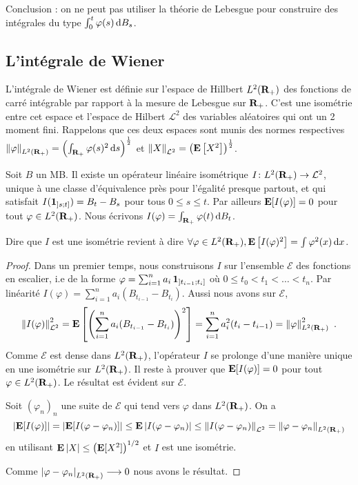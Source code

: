 	Conclusion : on ne peut pas utiliser la théorie de Lebesgue pour construire des intégrales du type $\int_0^t \varphi(s) \mathop{}\mathopen{}\mathrm{d} B_s$.


\subsection{L'intégrale de Wiener}

	L'intégrale de Wiener est définie sur l'espace de Hillbert $L^2(\mathbf{R}_+)$ des fonctions de carré intégrable par rapport à la mesure de Lebesgue sur $\mathbf{R}_+$.
	C'est une isométrie entre cet espace et l'espace de Hilbert $\mathcal{L}^2$ des variables aléatoires qui ont un 2 moment fini.
	Rappelons que ces deux espaces sont munis des normes respectives $\left\lVert\varphi\right\rVert_{L^2(\mathbf{R}_+)} = \left( \int_{\mathbf{R}_+} \varphi(s)^2 \mathop{}\mathopen{}\mathrm{d} s \right)^{\frac{1}{2}}$ et $\left\lVert X\right\rVert_{\mathcal{L}^2} = \left( \mathbf{E} \left[ X^2 \right] \right)^{\frac{1}{2}}$.
	
	\begin{thm}
		Soit $B$ un MB.
		Il existe un opérateur linéaire isométrique $I \colon L^2(\mathbf{R}_+) \to \mathcal{L}^2$, unique à une classe d'équivalence près pour l'égalité presque partout, et qui satisfait $I(\operatorname{\mathbf{1}}_{\mathopen{}\mathclose{\left]s\mathclose{}\mathpunct{};t\right]}}) = B_t - B_s$ pour tous $0 \leq s \leq t$.
		Par ailleurs $\mathbf{E}[I(\varphi)] = 0$ pour tout $\varphi \in L^2(\mathbf{R}_+)$.
		Nous écrivons $I(\varphi) = \int_{\mathbf{R}_+} \varphi(t) \mathop{}\mathopen{}\mathrm{d} B_t$.
	\end{thm}
	
	\begin{rem}
		Dire que $I$ est une isométrie revient à dire $\forall \varphi \in L^2(\mathbf{R}_+), \mathbf{E} \left[ I(\varphi)^2 \right] = \int \varphi^2(x) \mathop{}\mathopen{}\mathrm{d} x$.
	\end{rem}
	
	\begin{proof}
		Dans un premier temps, nous construisons $I$ sur l'ensemble $\mathcal{E}$ des fonctions en escalier, i.e de la forme $\varphi = \sum_{i = 1}^n a_i \operatorname{\mathbf{1}}_{\mathopen{}\mathclose{\left]t_{i-1}\mathclose{}\mathpunct{};t_i\right]}}$ où $0 \leq t_0 < t_1 < \ldots < t_n$.
		Par linéarité $I(\varphi) = \sum_{i = 1}^n a_i \left( B_{t_{i-1}} - B_{t_i} \right)$.
		Aussi nous avons sur $\mathcal{E}$,
		$$\left\lVert I(\varphi)\right\rVert_{\mathcal{L}^2}^2
			= \mathbf{E} \left[ \left( \sum_{i = 1}^n a_i (B_{t_{i-1}} - B_{t_i}) \right)^2 \right]
			= \sum_{i = 1}^n a_i^2 (t_i - t_{i-1})
			= \left\lVert\varphi\right\rVert_{L^2(\mathbf{R}_+)}^2\ .$$
		Comme $\mathcal{E}$ est dense dans $L^2(\mathbf{R}_+)$, l'opérateur $I$ se prolonge d'une manière unique en une isométrie sur $L^2(\mathbf{R}_+)$.
		Il reste à prouver que $\mathbf{E}[I(\varphi)] = 0$ pour tout $\varphi \in L^2(\mathbf{R}_+)$.
		Le résultat est évident sur $\mathcal{E}$.
		
		Soit $(\varphi_n)_n$ une suite de $\mathcal{E}$ qui tend vers $\varphi$ dans $L^2(\mathbf{R}_+)$.
		On a
		$$\left\lvert\mathbf{E}[I(\varphi)]\right\rvert
			= \left\lvert\mathbf{E}[I(\varphi - \varphi_n)]\right\rvert
			\leq \mathbf{E} \left\lvert I(\varphi - \varphi_n)\right\rvert
			\leq \left\lVert I(\varphi - \varphi_n)\right\rVert_{\mathcal{L}^2}
			= \left\lVert\varphi - \varphi_n\right\rVert_{L^2(\mathbf{R}_+)}$$
		en utilisant $\mathbf{E} \left\lvert X\right\rvert \leq \left( \mathbf{E}[X^2] \right)^{1/2}$ et $I$ est une isométrie.
		
		Comme $\left\lvert\varphi - \varphi_n\right\rvert_{L^2(\mathbf{R}_+)} \longrightarrow 0$ nous avons le résultat.
	\end{proof}
	
